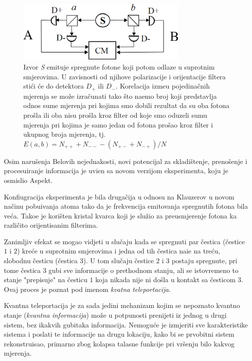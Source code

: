 \begin{figure}
    \centering
    \includegraphics[width=0.75\textwidth]{figures/chsh_scheme.eps}
    \caption{Izvor \textit{S} emituje spregnute fotone koji potom odlaze u suprotnim smjerovima. U zavisnosti od njihove polarizacije i orijentacije filtera sti\'ci \' ce do  detektora $D_+$ ili $D_-$.
    Korelacija izme\dj u pojedina\v cnih mjerenja se mo\v ze izra\v cunati tako \v sto
    na\dj emo broj koji predstavlja odnos sume mjerenja pri kojima smo dobili rezultat da su oba fotona pro\v sla ili oba nisu pro\v sla kroz filter
    od koje smo oduzeli sumu mjerenja pri kojima je samo jedan od fotona pro\v sao kroz filter i ukupnog broja mjerenja, tj.
       $E(a,b) = N_{++} + N_{--} - (N_{+-} + N_{-+})/N$}
    \label{fig:chsh_scheme}
\end{figure}

Osim naru\v senja Belovih nejednakosti, novi potencijal za skladi\v stenje, preno\v senje i procesuiranje informacija je uvi\dj en sa novom verzijom eksperimenta, koju je osmislio Aspekt.

Konfiugracija eksperimenta je bila druga\v cija  u odnosu na Klauzerov u novom na\v cinu pobu\dj ivanja atoma tako da je frekvencija emitovanja
spregnutih fotona bila ve\'ca. Tako\dj e je kori\v sten kristal kvarca koji je slu\v zio za preusmjerenje fotona ka razli\v cito orijentisanim filterima.

Zanimljiv efekat se mogao vidjeti u slu\v caju kada se spregnuti par \v cestica (\v cestice $1$ i $2$) kre\' ce u suprotnim smjerovima i jedna od tih \v cestica nai\dj e na tre\'cu, slobodnu \v cesticu (\v cestica $3$).
U tom slu\v caju \v cestice $2$ i $3$ postaju spregnute, pri tome \v cestica $3$ gubi sve informacije o prethodnom stanju, ali se istovremeno to stanje "prepisuje" na \v cesticu $1$ koja
nikada nije ni do\v sla u kontakt sa \v cesticom $3$. Ovaj proces je poznat pod imenom \textit{kvatna teleportacija}.

Kvantna teleportacija je za sada jedini mehanizam kojim se nepoznato kvantno stanje (\textit{kvantna informacija}) mo\v ze u potpunosti prenijeti iz jednog u drugi sistem,
bez ikakvih gubitaka informacija. Nemogu\'ce je izmjeriti sve karakteristike sistema i poslati te informacije na drugu lokaciju, kako bi se
prvobitni sistem rekonstruisao, primarno zbog kolapsa talasne funkcije pri vr\v senju bilo kakvog mjerenja.

